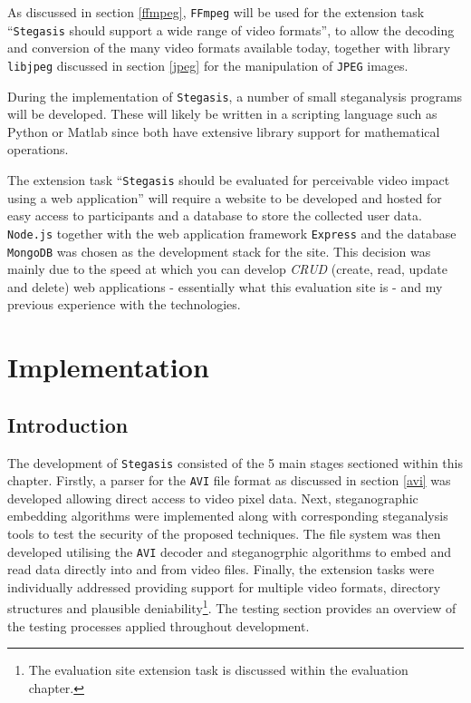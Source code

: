 \documentclass[paper=a4, fontsize=11pt,twoside]{scrartcl}    %
\numberwithin{table}{section}
\numberwithin{figure}{section}
\begin{document}
As discussed in section \ref{ffmpeg}, \texttt{FFmpeg} will be used for the extension task ``\texttt{Stegasis} should support a wide range of video formats'', to allow the decoding and conversion of the many video formats available today, together with library \texttt{libjpeg} discussed in section \ref{jpeg} for the manipulation of \texttt{JPEG} images. 

During the implementation of \texttt{Stegasis}, a number of small steganalysis programs will be developed. These will likely be written in a scripting language such as Python or Matlab since both have extensive library support for mathematical operations.

The extension task ``\texttt{Stegasis} should be evaluated for perceivable video impact using a web application'' will require a website to be developed and hosted for easy access to participants and a database to store the collected user data. \texttt{Node.js} together with the web application framework \texttt{Express} and the database \texttt{MongoDB} was chosen as the development stack for the site. This decision was mainly due to the speed at which you can develop \textit{CRUD} (create, read, update and delete) web applications - essentially what this evaluation site is - and my previous experience with the technologies.


\section{Implementation}

\subsection{Introduction}

The development of \texttt{Stegasis} consisted of the 5 main stages sectioned within this chapter. Firstly, a parser for the \texttt{AVI} file format as discussed in section \ref{avi} was developed allowing direct access to video pixel data. Next, steganographic embedding algorithms were implemented along with corresponding steganalysis tools to test the security of the proposed techniques. The file system was then developed utilising the \texttt{AVI} decoder and steganogrphic algorithms to embed and read data directly into and from video files. Finally, the extension tasks were individually addressed providing support for multiple video formats, directory structures and plausible deniability\footnote{The evaluation site extension task is discussed within the evaluation chapter.}. The testing section provides an overview of the testing processes applied throughout development. 
\end{document}
